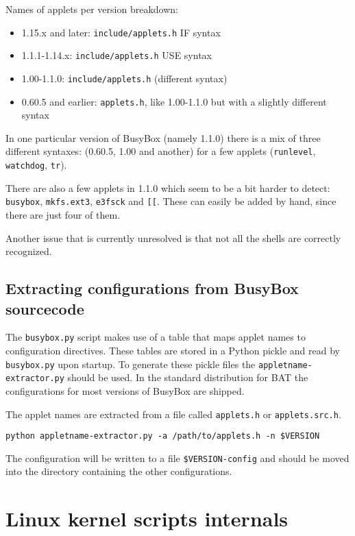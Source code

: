 \documentclass[10pt]{article}
\begin{document}
Names of applets per version breakdown:

\begin{itemize}
\item 1.15.x and later: \texttt{include/applets.h} IF syntax
\item 1.1.1-1.14.x: \texttt{include/applets.h} USE syntax
\item 1.00-1.1.0: \texttt{include/applets.h} (different syntax)
\item 0.60.5 and earlier: \texttt{applets.h}, like 1.00-1.1.0 but with a
slightly different syntax
\end{itemize}

In one particular version of BusyBox (namely 1.1.0) there is a mix of three
different syntaxes: (0.60.5, 1.00 and another) for a few applets
(\texttt{runlevel}, \texttt{watchdog}, \texttt{tr}).

There are also a few applets in 1.1.0 which seem to be a bit harder to detect:
\texttt{busybox}, \texttt{mkfs.ext3}, \texttt{e3fsck} and \texttt{[[}. These
can easily be added by hand, since there are just four of them.

Another issue that is currently unresolved is that not all the shells are
correctly recognized.

\subsection{Extracting configurations from BusyBox sourcecode}

The \texttt{busybox.py} script makes use of a table that maps applet names to
configuration directives. These tables are stored in a Python pickle and read
by \texttt{busybox.py} upon startup. To generate these pickle files the
\texttt{appletname-extractor.py} should be used. In the standard distribution
for BAT the configurations for most versions of BusyBox are shipped.

The applet names are extracted from a file called \texttt{applets.h} or
\texttt{applets.src.h}.

\begin{verbatim}
python appletname-extractor.py -a /path/to/applets.h -n $VERSION
\end{verbatim}

The configuration will be written to a file \texttt{\$VERSION-config} and
should be moved into the directory containing the other configurations.

\section{Linux kernel scripts internals}
\end{document}
